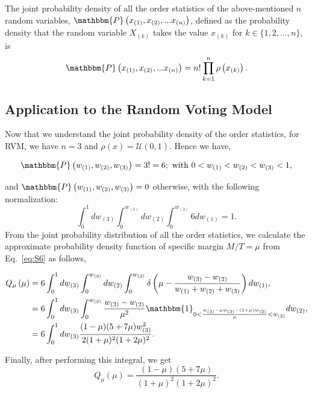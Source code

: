 The joint probability density of all the order statistics of the above-mentioned $n$ random variables, $\mathbbm{P}\left(x_{(1)}, x_{(2)}, ... x_{(n)}\right)$, defined as the probability density that the random variable $X_{(k)}$ takes the value $x_{(k)}$ for $k \in \{ 1, 2, \dots, n\}$, is
\begin{equation}
    \mathbbm{P}\left(x_{(1)}, x_{(2)}, ... x_{(n)}\right) = n!\prod_{k=1}^{n}\rho\left(x_{(k)}\right).
\end{equation}
\subsection{Application to the Random Voting Model}
Now that we understand the joint probability density of the order statistics, for RVM, we have $n = 3$ and $\rho(x) = \mathcal{U}(0, 1)$. Hence we have,    
\begin{center}
    \begin{align}
        \mathbbm{P}\left(w_{(1)}, w_{(2)}, w_{(3)}\right) = 3! = 6; \text{ with } 0<w_{(1)}<w_{(2)}<w_{(3)}<1,
    \end{align}
\end{center}
and $\mathbbm{P}\left(w_{(1)}, w_{(2)}, w_{(3)}\right) = 0$ otherwise, with the following normalization:
\begin{equation}
    \int_{0}^{1}dw_{(3)}\int_{0}^{w_{(3)}}dw_{(2)}\int_{0}^{w_{(2)}} 6 dw_{(1)} = 1.
\end{equation}
From the joint probability distribution of all the order statistics, we calculate the approximate probability density function of specific margin $ M / T = \mu$ from Eq.~\eqref{eq:S6} as follows, 
\begin{center}
    \begin{align}
        \nonumber Q_{\mu}\left(\mu\right) & = 6 \nonumber \int_{0}^{1}dw_{(3)}\int_{0}^{w_{(3)}}dw_{(2)}\int_{0}^{w_{(2)}} \delta\left(\mu - \frac{w_{(3)}- w_{(2)}}{w_{(1)} + w_{(2)} + w_{(3)}}\right)dw_{(1)},\\
        & = 6 \int_{0}^{1}dw_{(3)}\int_{0}^{w_{(3)}} \frac{w_{(3)} - w_{(2)}}{\mu^2} \nonumber \mathbbm{1}_{0<\frac{w_{(3)} - \mu w_{(3)} - (1 + \mu)w_{(2)}}{\mu}<w_{(2)}} dw_{(2)},\\
        & = 6 \int_{0}^{1}dw_{(3)} \frac{(1 - \mu)(5 + 7\mu)w_{(3)}^2}{2(1 + \mu)^2(1 + 2\mu)^2}.\\
    \end{align}
\end{center}
Finally, after performing this integral, we get 
\begin{equation}
    Q_{\mu}\left(\mu\right) = \frac{(1 - \mu)(5 + 7\mu)}{(1 + \mu)^2(1 + 2\mu)^2}.
\end{equation}

